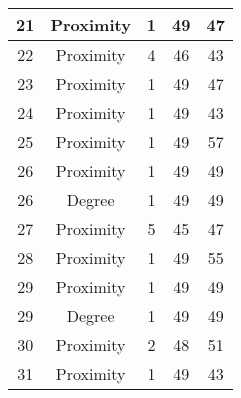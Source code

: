 \documentclass[results.tex]{subfiles}
\begin{document}
\begin{center}
\begin{tabular}{| c || c | c | c | c |}
            \hline
            21                      & Proximity                    & 1                      & 49                      & 47                   \\
            \hline
            22                      & Proximity                    & 4                      & 46                      & 43                   \\
            \hline
            23                      & Proximity                    & 1                      & 49                      & 47                   \\
            \hline
            24                      & Proximity                    & 1                      & 49                      & 43                   \\
            \hline
            25                      & Proximity                    & 1                      & 49                      & 57                   \\
            \hline
            26                      & Proximity                    & 1                      & 49                      & 49                   \\
            \hline
            26                      & Degree                       & 1                      & 49                      & 49                   \\
            \hline
            27                      & Proximity                    & 5                      & 45                      & 47                   \\
            \hline
            28                      & Proximity                    & 1                      & 49                      & 55                   \\
            \hline
            29                      & Proximity                    & 1                      & 49                      & 49                   \\
            \hline
            29                      & Degree                       & 1                      & 49                      & 49                   \\
            \hline
            30                      & Proximity                    & 2                      & 48                      & 51                   \\
            \hline
            31                      & Proximity                    & 1                      & 49                      & 43                   \\

\end{tabular}
\end{center}
\end{document}

